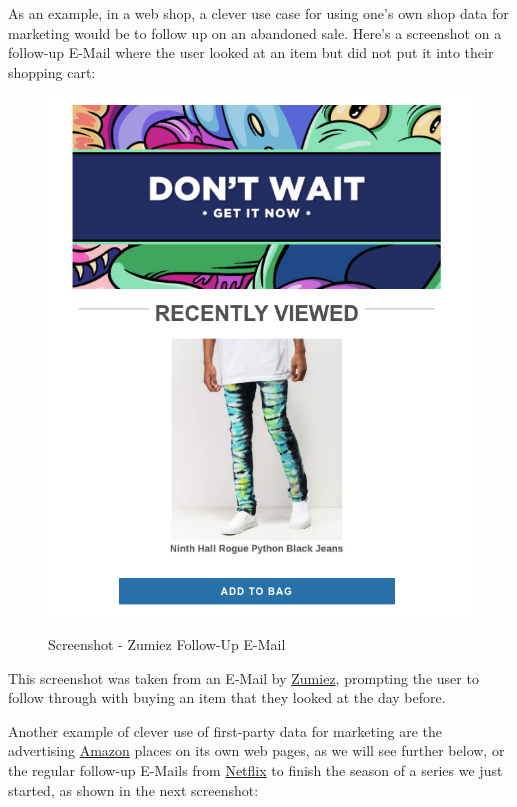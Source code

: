 As an example, in a web shop, a clever use case for using one's own shop data for marketing would be to follow up on an abandoned sale. Here's a screenshot on a follow-up E-Mail where the user looked at an item but did not put it into their shopping cart:

\begin{figure}[H]
\centering
\caption {Screenshot - Zumiez Follow-Up E-Mail}
\includegraphics[scale=0.6]{images/zumiez-dont-wait.png}
\label{fig:zumiez}
\end{figure}

This screenshot was taken from an E-Mail by \href{https://www.zumiez.com/}{Zumiez}, prompting the user to follow through with buying an item that they looked at the day before.

Another example of clever use of first-party data for marketing are the advertising \href{https://smile.amazon.de/}{Amazon} places on its own web pages, as we will see further below, or the regular follow-up E-Mails from \href{https://www.netflix.com/de-en/}{Netflix} to finish the season of a series we just started, as shown in the next screenshot:

